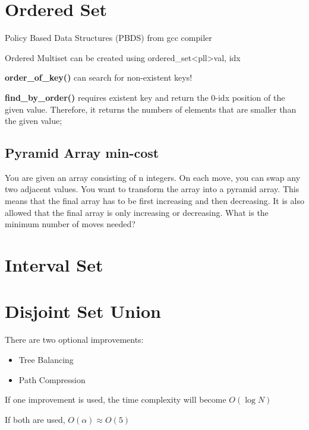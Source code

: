 \section{Ordered Set}

    Policy Based Data Structures (PBDS) from gcc compiler

    Ordered Multiset can be created using ordered\_set\textless pll\textgreater {val, idx}

    \textbf{order\_of\_key()} can search for non-existent keys!
    
    \textbf{find\_by\_order()} requires existent key and return the 0-idx position of the given value.
    Therefore, it returns the numbers of elements that are smaller than the given value;


    \subsection{Pyramid Array min-cost}

    You are given an array consisting of n integers. On each move, you can swap any two adjacent values.
    You want to transform the array into a pyramid array. This means that the final array has to be first increasing and then decreasing. 
    It is also allowed that the final array is only increasing or decreasing.
    What is the minimum number of moves needed?


\section{Interval Set}


\section{Disjoint Set Union}

    There are two optional improvements:

    \begin{itemize}
        \item Tree Balancing 
        \item Path Compression
    \end{itemize}
    If one improvement is used, 
    the time complexity will become $O(\log{N})$

    If both are used, $O(\alpha) \approx O(5)$

